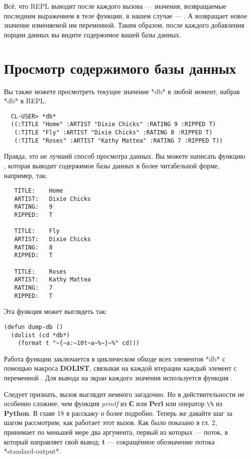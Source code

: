 Всё, что REPL выводит после каждого вызова  --- значения, возвращаемые
последним выражением в теле функции, в нашем случае --- . А 
возвращает новое значение изменяемой им переменной. Таким образом, после каждого
добавления порции данных вы видите содержимое вашей базы данных.

\section{Просмотр содержимого базы данных}

Вы также можете просмотреть текущее значение *db* в любой момент, набрав *db* в REPL.

\begin{verbatim}
  CL-USER> *db*
  ((:TITLE "Home" :ARTIST "Dixie Chicks" :RATING 9 :RIPPED T)
   (:TITLE "Fly" :ARTIST "Dixie Chicks" :RATING 8 :RIPPED T)
   (:TITLE "Roses" :ARTIST "Kathy Mattea" :RATING 7 :RIPPED T))
\end{verbatim}

Правда, это не лучший способ просмотра данных. Вы можете написать функцию ,
которая выводит содержимое базы данных в более читабельной форме, например, так:

\begin{verbatim}
   TITLE:    Home
   ARTIST:   Dixie Chicks
   RATING:   9
   RIPPED:   T
   
   TITLE:    Fly
   ARTIST:   Dixie Chicks
   RATING:   8
   RIPPED:   T
   
   TITLE:    Roses
   ARTIST:   Kathy Mattea
   RATING:   7
   RIPPED:   T
\end{verbatim}

Эта функция может выглядеть так:

\begin{lstlisting}
(defun dump-db ()
  (dolist (cd *db*)
    (format t "~{~a:~10t~a~%~}~%" cd)))
\end{lstlisting}

Работа функции заключается в циклическом обходе всех элементов *db* с помощью макроса
\textbf{DOLIST}, связывая на каждой итерации каждый элемент с переменной . Для
вывода на экран каждого значения  используется функция .

Следует признать, вызов  выглядит немного загадочно. Но в действительности
 не особенно сложнее, чем функция \textit{printf} из \textbf{С} или
\textbf{Perl} или оператор \lstinline!\%! из \textbf{Python}. В главе 18 я расскажу о
 более подробно. Теперь же давайте шаг за шагом рассмотрим, как работает этот
вызов. Как было показано в гл. 2,  принимает по меньшей мере два аргумента,
первый из которых --- поток, в который  направляет свой вывод; \textbf{t} ---
сокращённое обозначение потока *standard-output*.

